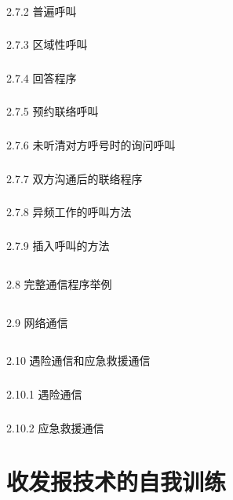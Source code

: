 \documentclass[12pt,UTF8]{ctexbook}
\begin{document}
\subsection{}2.7.2 普遍呼叫
\subsection{}2.7.3 区域性呼叫
\subsection{}2.7.4 回答程序
\subsection{}2.7.5 预约联络呼叫
\subsection{}2.7.6 未听清对方呼号时的询问呼叫
\subsection{}2.7.7 双方沟通后的联络程序
\subsection{}2.7.8 异频工作的呼叫方法
\subsection{}2.7.9 插入呼叫的方法
\section{}2.8 完整通信程序举例
\section{}2.9 网络通信
\section{}2.10 遇险通信和应急救援通信
\subsection{}2.10.1 遇险通信
\subsection{}2.10.2 应急救援通信

\chapter{收发报技术的自我训练}
\end{document}
